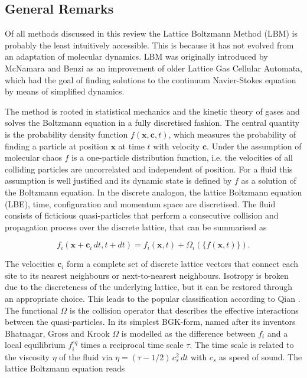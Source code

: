 \documentclass[8.5pt,twoside,twocolumn]{article}
\newcommand{\beq}{\begin{equation}}
\newcommand{\eeq}{\end{equation}}
\begin{document}
\subsection{General Remarks}

Of all methods discussed in this review the Lattice Boltzmann Method (LBM) \cite{Succi:2001, Guo:2013} 
is probably the least intuitively accessible. This is because it has not evolved from an 
adaptation of molecular dynamics. LBM was originally introduced by McNamara \cite{McNamara:1988} and 
Benzi \cite{Benzi:1992} as an improvement of older Lattice Gas Cellular Automata,
which had the goal of finding solutions to the continuum Navier-Stokes equation by 
means of simplified dynamics. 

The method is rooted in statistical 
mechanics and the kinetic theory of gases and solves the Boltzmann equation
in a fully discretised fashion.
The central quantity is the probability density function
$f(\mathbf{x}, \mathbf{c}, t)$, which measures the probability of finding
a particle at position $\mathbf{x}$ at time $t$ with velocity $\mathbf{c}$.
Under the assumption of molecular chaos $f$ is a one-particle distribution function,
i.e. the velocities of all colliding particles are uncorrelated and independent of position. 
For a fluid this assumption is well justified and its dynamic state is defined
by $f$ as a solution of the Boltzmann equation. 
In the discrete analogon, the lattice Boltzmann equation (LBE), time, configuration 
and momentum space are discretised. 
The fluid consists of ficticious quasi-particles that perform a consecutive 
collision and propagation process over the discrete lattice, that can be
summarised as

\beq\label{lbe}
f_i(\mathbf{x}+\mathbf{c}_i\, dt, t+dt)=f_i(\mathbf{x}, t)+\Omega_i(\{f(\mathbf{x},t)\}).
\eeq

The velocities $\mathbf{c}_i$ form a complete set of discrete lattice vectors that
connect each site to its nearest neighbours or next-to-nearest neighbours. 
Isotropy is broken due to the discreteness of the underlying lattice,  but it can be 
restored through an appropriate choice. This leads to the popular classification 
according to Qian \cite{Qian:1992}.
The functional $\Omega$ is the collision operator that describes the effective interactions 
between the quasi-particles. In its simplest BGK-form, named after its inventors
Bhatnagar, Gross and Krook  $\Omega$ is modelled as  
the difference between $f_i$ and a local equilibrium $f_i^{eq}$ times a reciprocal 
time scale $\tau$. The time scale is related to the viscosity $\eta$ of the fluid via 
$\eta =(\tau - 1/2)\,c_s^2\,dt$ with $c_s$ as speed of sound. The lattice Boltzmann
equation reads
\end{document}
